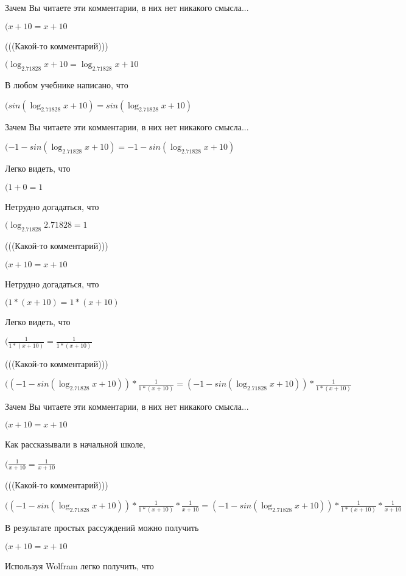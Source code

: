 \documentclass[12pt,a4paper,fleqn]{article}
\theoremstyle{definition}
\begin{document}
Зачем Вы читаете эти комментарии, в них нет никакого смысла...

$( x  +  10  =  x  +  10 $

(((Какой-то комментарий)))

$(\log_{ 2.71828 }{ x  +  10 } = \log_{ 2.71828 }{ x  +  10 }$

В любом учебнике написано, что

$(sin(\log_{ 2.71828 }{ x  +  10 }) = sin(\log_{ 2.71828 }{ x  +  10 })$

Зачем Вы читаете эти комментарии, в них нет никакого смысла...

$( -1  - sin(\log_{ 2.71828 }{ x  +  10 }) =  -1  - sin(\log_{ 2.71828 }{ x  +  10 })$

Легко видеть, что

$( 1  +  0  =  1 $

Нетрудно догадаться, что

$(\log_{ 2.71828 }{ 2.71828 } =  1 $

(((Какой-то комментарий)))

$( x  +  10  =  x  +  10 $

Нетрудно догадаться, что

$( 1  * ( x  +  10 ) =  1  * ( x  +  10 )$

Легко видеть, что

$(\frac{ 1 }{ 1  * ( x  +  10 )}
 = \frac{ 1 }{ 1  * ( x  +  10 )}
$

(((Какой-то комментарий)))

$(( -1  - sin(\log_{ 2.71828 }{ x  +  10 })) * \frac{ 1 }{ 1  * ( x  +  10 )}
 = ( -1  - sin(\log_{ 2.71828 }{ x  +  10 })) * \frac{ 1 }{ 1  * ( x  +  10 )}
$

Зачем Вы читаете эти комментарии, в них нет никакого смысла...

$( x  +  10  =  x  +  10 $

Как рассказывали в начальной школе,

$(\frac{ 1 }{ x  +  10 }
 = \frac{ 1 }{ x  +  10 }
$

(((Какой-то комментарий)))

$(( -1  - sin(\log_{ 2.71828 }{ x  +  10 })) * \frac{ 1 }{ 1  * ( x  +  10 )}
 * \frac{ 1 }{ x  +  10 }
 = ( -1  - sin(\log_{ 2.71828 }{ x  +  10 })) * \frac{ 1 }{ 1  * ( x  +  10 )}
 * \frac{ 1 }{ x  +  10 }
$

В результате простых рассуждений можно получить

$( x  +  10  =  x  +  10 $

Используя Wolfram легко получить, что
\end{document}
